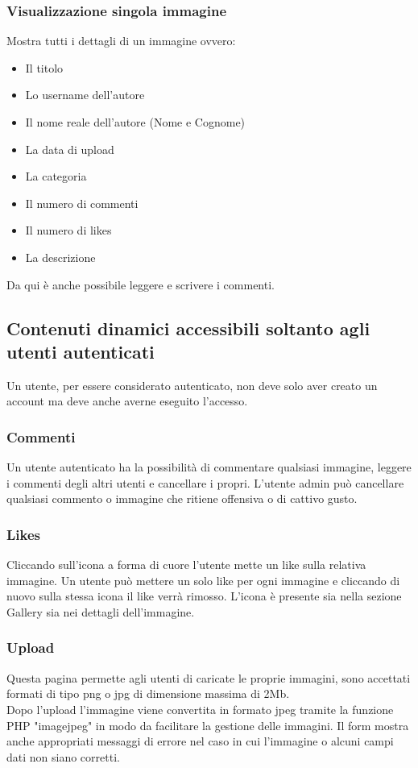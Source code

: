 \documentclass[openany, a4paper, 12pt]{report}
\begin{document}
		\subsubsection{Visualizzazione singola immagine}
		Mostra tutti i dettagli di un immagine ovvero:
		\begin{itemize}
					\item Il titolo
					\item Lo username dell'autore
					\item Il nome reale dell'autore (Nome e Cognome)
					\item La data di upload
					\item La categoria
					\item Il numero di commenti
					\item Il numero di likes
					\item La descrizione
		\end{itemize}
		Da qui è anche possibile leggere e scrivere i commenti.
				
	\subsection{Contenuti dinamici accessibili soltanto agli utenti autenticati}
	Un utente, per essere considerato autenticato, non deve solo aver creato un account ma deve anche averne eseguito l'accesso.
	
		\subsubsection{Commenti}
		Un utente autenticato ha la possibilità di commentare qualsiasi immagine, leggere i commenti degli altri utenti e cancellare i propri. L'utente admin può cancellare qualsiasi commento o immagine che ritiene offensiva o di cattivo gusto.
		
		\subsubsection{Likes}
		Cliccando sull'icona a forma di cuore l'utente mette un like sulla relativa immagine. Un utente può mettere un solo like per ogni immagine e cliccando di nuovo sulla stessa icona il like verrà rimosso.
		L'icona è presente sia nella sezione Gallery sia nei dettagli dell'immagine.

		\subsubsection{Upload}
		Questa pagina permette agli utenti di caricate le proprie immagini, sono accettati formati di tipo png o jpg di dimensione massima di 2Mb.\\
		Dopo l'upload l'immagine viene convertita in formato jpeg tramite la funzione PHP "imagejpeg" in modo da facilitare la gestione delle immagini. Il form mostra anche appropriati messaggi di errore nel caso in cui l'immagine o alcuni campi dati non siano corretti.
		
\end{document}
